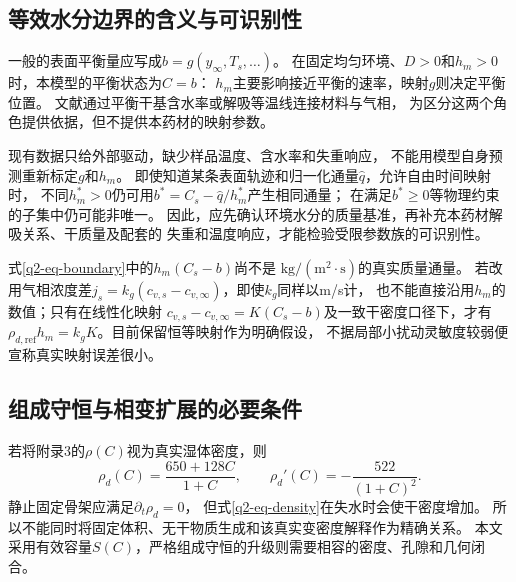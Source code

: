 \subsection{等效水分边界的含义与可识别性}
一般的表面平衡量应写成$b=g(y_\infty,T_s,\ldots)$。
在固定均匀环境、$D>0$和$h_m>0$时，本模型的平衡状态为$C=b$：
$h_m$主要影响接近平衡的速率，映射$g$则决定平衡位置。
文献通过平衡干基含水率或解吸等温线连接材料与气相\cite{dasilva2014,adrover2020}，
为区分这两个角色提供依据，但不提供本药材的映射参数。

现有数据只给外部驱动，缺少样品温度、含水率和失重响应，
不能用模型自身预测重新标定$g$和$h_m$。
即使知道某条表面轨迹和归一化通量$\hat q$，允许自由时间映射时，
不同$h_m^*>0$仍可用$b^*=C_s-\hat q/h_m^*$产生相同通量；
在满足$b^*\geq0$等物理约束的子集中仍可能非唯一。
因此，应先确认环境水分的质量基准，再补充本药材解吸关系、干质量及配套的
失重和温度响应，才能检验受限参数族的可识别性。

式\eqref{q2-eq-boundary}中的$h_m(C_s-b)$尚不是
$\mathrm{kg/(m^2\cdot s)}$的真实质量通量。
若改用气相浓度差$j_s=k_g(c_{v,s}-c_{v,\infty})$，即使$k_g$同样以m/s计，
也不能直接沿用$h_m$的数值；只有在线性化映射
$c_{v,s}-c_{v,\infty}=K(C_s-b)$及一致干密度口径下，才有
$\rho_{d,\mathrm{ref}}h_m=k_gK$。目前保留恒等映射作为明确假设，
不据局部小扰动灵敏度较弱便宣称真实映射误差很小。

\subsection{组成守恒与相变扩展的必要条件}
若将附录3的$\rho(C)$视为真实湿体密度，则
\begin{equation}
 \rho_d(C)=\frac{650+128C}{1+C},\qquad
 \rho_d'(C)=-\frac{522}{(1+C)^2}.
\label{q2-eq-density}
\end{equation}
静止固定骨架应满足$\partial_t\rho_d=0$，
但式\eqref{q2-eq-density}在失水时会使干密度增加。
所以不能同时将固定体积、无干物质生成和该真实变密度解释作为精确关系。
本文采用有效容量$S(C)$，严格组成守恒的升级则需要相容的密度、孔隙和几何闭合。

